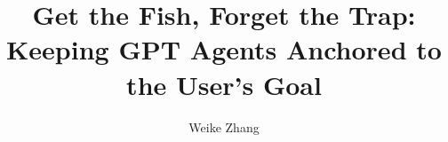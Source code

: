 \documentclass[11pt]{article}
\title{Get the Fish, Forget the Trap:\\Keeping GPT Agents Anchored to the User's Goal}
\author{Weike Zhang}
\date{}
\begin{document}
\maketitle

\begin{abstract}

\end{abstract}












\appendix

\end{document}
